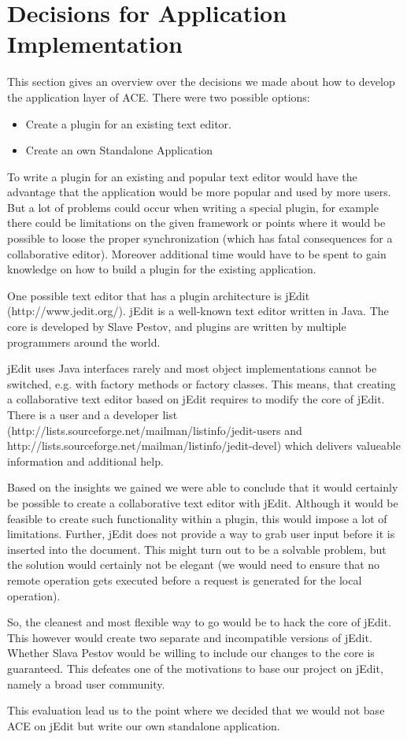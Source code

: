 \chapter{Decisions for Application Implementation}
\label{chapter:decisionsapplication}

This section gives an overview over the decisions we made about how to develop the application layer of ACE. There were two possible options:
\begin{itemize}
\item Create a plugin for an existing text editor.
\item Create an own Standalone Application
\end{itemize}
To write a plugin for an existing and popular text editor would have the advantage that the application would be more popular and used by more users. But a lot of problems could occur when writing a special plugin, for example there could be limitations on the given framework or points where it would be possible to loose the proper synchronization (which has fatal consequences for a collaborative editor). Moreover additional time would have to be spent to gain knowledge on how to build a plugin for the existing application.

One possible text editor that has a plugin architecture is jEdit (http://www.jedit.org/). jEdit is a well-known text editor written in Java. The core is developed by Slave Pestov, and plugins are written by multiple programmers around the world.

jEdit uses Java interfaces rarely and most object implementations cannot be switched, e.g. with factory methods or factory classes. This means, that creating a collaborative text editor based on jEdit requires to modify the core of jEdit. There is a user and a developer list (http://lists.sourceforge.net/mailman/listinfo/jedit-users and http://lists.sourceforge.net/mailman/listinfo/jedit-devel) which delivers valueable information and additional help.

Based on the insights we gained we were able to conclude that it would certainly be possible to create a collaborative text editor with jEdit. Although it would be feasible to create such functionality within a plugin, this would impose a lot of limitations. Further, jEdit does not provide a way to grab user input before it is inserted into the document. This might turn out to be a solvable problem, but the solution would certainly not be elegant (we would need to ensure that no remote operation gets executed before a request is generated for the local operation).

So, the cleanest and most flexible way to go would be to hack the core of jEdit. This however would create two separate and incompatible versions of jEdit. Whether Slava Pestov would be willing to include our changes to the core is guaranteed. This defeates one of the motivations to base our project on jEdit, namely a broad user community.

This evaluation lead us to the point where we decided that we would not base ACE on jEdit but write our own standalone application.
